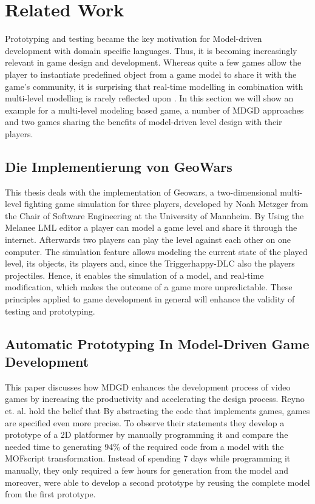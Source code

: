 \chapter{Related Work}
Prototyping and testing became the key motivation for Model-driven development with domain specific languages. Thus, it is becoming increasingly relevant in game design and development. Whereas quite a few games allow the player to instantiate predefined object from a game model to share it with the game's community, it is surprising that real-time modelling in combination with multi-level modelling is rarely reflected upon \cite{Noah}. In this section we will show an example for a multi-level modeling based game, a number of MDGD approaches and two games sharing the benefits of model-driven level design with their players.
\section[Eine Deep-Model-Basierte Echtzeitsimulation]{Die Implementierung von GeoWars\cite{Noah}}
This thesis deals with the implementation of Geowars, a two-dimensional multi-level fighting game simulation for three players, developed by Noah Metzger from the Chair of Software Engineering at the University of Mannheim. By Using the Melanee LML editor a player can model a game level and share it through the internet. Afterwards two players can play the level against each other on one computer. The simulation feature allows modeling the current state of the played level, its objects, its players and, since the Triggerhappy-DLC also the players projectiles. Hence, it enables the simulation of a model, and real-time modification, which makes the outcome of a game more unpredictable. These principles applied to game development in general will enhance the validity of testing and prototyping.

\section{Automatic Prototyping In Model-Driven Game Development\cite{reyno2009automatic}}
This paper discusses how MDGD enhances the development process of video games by increasing the productivity and accelerating the design process. Reyno et. al. hold the belief that By abstracting the code that implements games, games are specified even more precise. To observe their statements they develop a prototype of a 2D platformer by manually programming it and compare the needed time to generating 94\% of the required code from a model with the MOFscript transformation. Instead of spending 7 days while programming it manually, they only required a few hours for generation from the model and moreover, were able to develop a second prototype by reusing the complete model from the first prototype.

